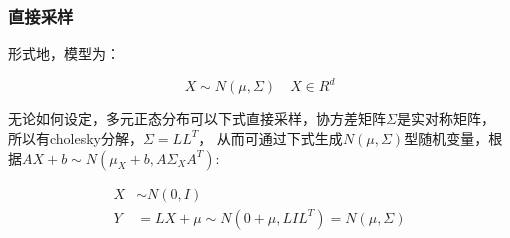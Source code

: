 \documentclass{beamer}
\begin{document}
\begin{frame}
\end{frame}

\begin{frame}
\frametitle{直接采样}

形式地，模型为：

$$
X \sim N(\mu, \Sigma) \quad X \in R^d
$$

无论如何设定，多元正态分布可以下式直接采样，协方差矩阵$\Sigma$是实对称矩阵，
所以有cholesky分解，$\Sigma = LL^T$，
从而可通过下式生成$N(\mu,\Sigma)$型随机变量，根据$AX+b \sim N(\mu_X + b, A\Sigma_XA^T)$:

\begin{align*}
    X &\sim N(0, I) \\
    Y &= L X + \mu \sim N(0+\mu,LIL^T) = N(\mu, \Sigma)
\end{align*}


\end{frame}
\end{document}
